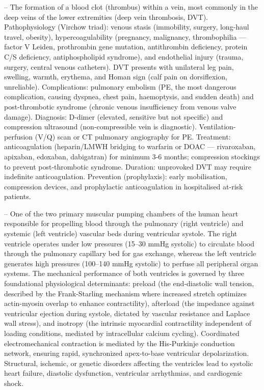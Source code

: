 -- The formation of a blood clot (thrombus) within a vein, most commonly in the deep veins of the lower extremities (deep vein thrombosis, DVT). Pathophysiology (Virchow triad): venous stasis (immobility, surgery, long-haul travel, obesity), hypercoagulability (pregnancy, malignancy, thrombophilia — factor V Leiden, prothrombin gene mutation, antithrombin deficiency, protein C/S deficiency, antiphospholipid syndrome), and endothelial injury (trauma, surgery, central venous catheters). DVT presents with unilateral leg pain, swelling, warmth, erythema, and Homan sign (calf pain on dorsiflexion, unreliable). Complications: pulmonary embolism (PE, the most dangerous complication, causing dyspnea, chest pain, haemoptysis, and sudden death) and post-thrombotic syndrome (chronic venous insufficiency from venous valve damage). Diagnosis: D-dimer (elevated, sensitive but not specific) and compression ultrasound (non-compressible vein is diagnostic). Ventilation-perfusion (V/Q) scan or CT pulmonary angiography for PE. Treatment: anticoagulation (heparin/LMWH bridging to warfarin or DOAC — rivaroxaban, apixaban, edoxaban, dabigatran) for minimum 3-6 months; compression stockings to prevent post-thrombotic syndrome. Duration: unprovoked DVT may require indefinite anticoagulation. Prevention (prophylaxis): early mobilisation, compression devices, and prophylactic anticoagulation in hospitalised at-risk patients.

-- One of the two primary muscular pumping chambers of the human heart responsible for propelling blood through the pulmonary (right ventricle) and systemic (left ventricle) vascular beds during ventricular systole. The right ventricle operates under low pressures (15--30 mmHg systolic) to circulate blood through the pulmonary capillary bed for gas exchange, whereas the left ventricle generates high pressures (100--140 mmHg systolic) to perfuse all peripheral organ systems. The mechanical performance of both ventricles is governed by three foundational physiological determinants: preload (the end-diastolic wall tension, described by the Frank-Starling mechanism where increased stretch optimizes actin-myosin overlap to enhance contractility), afterload (the impedance against ventricular ejection during systole, dictated by vascular resistance and Laplace wall stress), and inotropy (the intrinsic myocardial contractility independent of loading conditions, mediated by intracellular calcium cycling). Coordinated electromechanical contraction is mediated by the His-Purkinje conduction network, ensuring rapid, synchronized apex-to-base ventricular depolarization. Structural, ischemic, or genetic disorders affecting the ventricles lead to systolic heart failure, diastolic dysfunction, ventricular arrhythmias, and cardiogenic shock.

